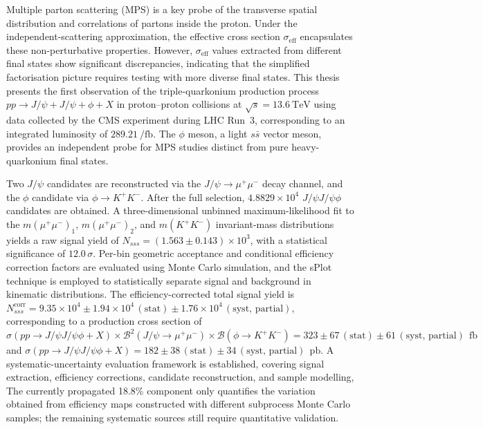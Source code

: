\begin{abstract*}
  Multiple parton scattering (MPS) is a key probe of the transverse spatial distribution
  and correlations of partons inside the proton. Under the independent-scattering
  approximation, the effective cross section $\sigma_{\mathrm{eff}}$ encapsulates these
  non-perturbative properties. However, $\sigma_{\mathrm{eff}}$ values extracted from
  different final states show significant discrepancies, indicating that the simplified
  factorisation picture requires testing with more diverse final states.
  This thesis presents the first observation of the triple-quarkonium production process
  $pp \to J/\psi + J/\psi + \phi + X$ in proton--proton collisions at $\sqrt{s}=\SI{13.6}{\tera\eV}$
  using data collected by the CMS experiment during LHC Run~3, corresponding to an
  integrated luminosity of $\SI{289.21}{\per\femto\barn}$.
  The $\phi$ meson, a light $s\bar{s}$ vector meson, provides an independent probe
  for MPS studies distinct from pure heavy-quarkonium final states.

  Two $J/\psi$ candidates are reconstructed via the $J/\psi \to \mu^+\mu^-$ decay channel,
  and the $\phi$ candidate via $\phi \to K^+K^-$.
  After the full selection, $4.8829\times10^4$ $J/\psi J/\psi \phi$ candidates are obtained.
  A three-dimensional unbinned maximum-likelihood fit to the $m(\mu^+\mu^-)_1$,
  $m(\mu^+\mu^-)_2$, and $m(K^+K^-)$ invariant-mass distributions yields a raw signal yield
  of $N_{sss}=(1.563\pm0.143)\times10^3$, with a statistical significance of $12.0\,\sigma$.
  Per-bin geometric acceptance and conditional efficiency correction factors are
  evaluated using Monte Carlo simulation, and the sPlot technique is employed to
  statistically separate signal and background in kinematic distributions.
  The efficiency-corrected total signal yield is $N_{sss}^{\mathrm{corr}} = 9.35 \times 10^4 \pm 1.94 \times 10^4\,(\mathrm{stat}) \pm 1.76 \times 10^4\,(\mathrm{syst,\,partial})$,
  corresponding to a production cross section of
  $\sigma(pp \to J/\psi J/\psi \phi + X) \times \mathcal{B}^2(J/\psi \to \mu^+\mu^-) \times \mathcal{B}(\phi \to K^+K^-) = 323 \pm 67\,(\mathrm{stat}) \pm 61\,(\mathrm{syst,\,partial})~\SI{}{\femto\barn}$
  and $\sigma(pp \to J/\psi J/\psi \phi + X) = 182 \pm 38\,(\mathrm{stat}) \pm 34\,(\mathrm{syst,\,partial})~\SI{}{\pico\barn}$.
  A systematic-uncertainty evaluation framework is established, covering signal extraction,
  efficiency corrections, candidate reconstruction, and sample modelling,
  The currently propagated 18.8\% component only quantifies the variation obtained
  from efficiency maps constructed with different subprocess Monte Carlo samples;
  the remaining systematic sources still require quantitative validation.


\end{abstract*}
